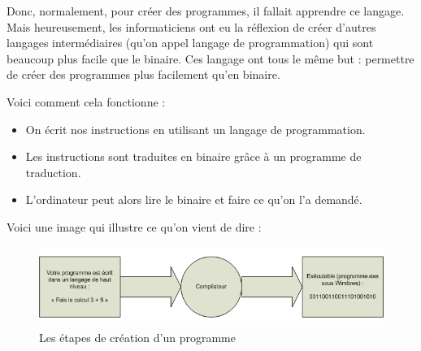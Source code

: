 \documentclass[12pt]{article}
\begin{document}
            Donc, normalement, pour créer des programmes, il fallait apprendre ce langage.
            Mais heureusement, les informaticiens ont eu la réflexion de créer d'autres langages intermédiaires
            (qu'on appel langage de programmation) qui sont beaucoup plus facile que le binaire. Ces langage ont
            tous le même but : permettre de créer des programmes plus facilement qu'en binaire.

            Voici comment cela fonctionne :
            \begin{itemize}
                \item On écrit nos instructions en utilisant un langage de programmation.
                \item Les instructions sont traduites en binaire grâce à un programme de traduction.
                \item L'ordinateur peut alors lire le binaire et faire ce qu'on l'a demandé.
            \end{itemize}

            Voici une image qui illustre ce qu'on vient de dire :
            \begin{figure}[H]
                \centering
                \includegraphics[width=\linewidth]{img/11_compilation.png}
                \caption{Les étapes de création d'un programme}
            \end{figure}

\end{document}
